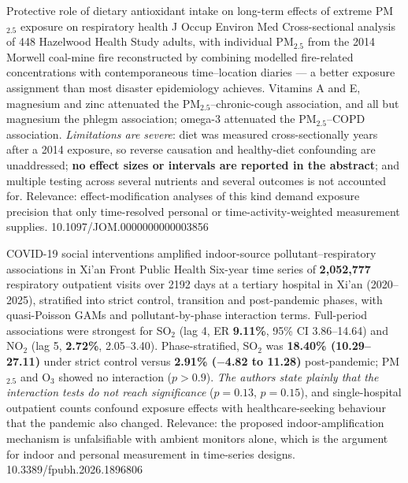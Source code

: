 \documentclass[10pt]{article}
\begin{document}
{Protective role of dietary antioxidant intake on long-term effects of extreme PM$_{2.5}$
exposure on respiratory health}
{J Occup Environ Med}
{Cross-sectional analysis of 448 Hazelwood Health Study adults, with individual PM$_{2.5}$
from the 2014 Morwell coal-mine fire reconstructed by combining modelled fire-related
concentrations with contemporaneous time--location diaries --- a better exposure
assignment than most disaster epidemiology achieves. Vitamins A and E, magnesium and zinc
attenuated the PM$_{2.5}$--chronic-cough association, and all but magnesium the
phlegm association; omega-3 attenuated the PM$_{2.5}$--COPD association. \emph{Limitations
are severe}: diet was measured cross-sectionally years after a 2014 exposure, so reverse
causation and healthy-diet confounding are unaddressed; \textbf{no effect sizes or
intervals are reported in the abstract}; and multiple testing across several nutrients
and several outcomes is not accounted for. Relevance: effect-modification analyses of this
kind demand exposure precision that only time-resolved personal or
time-activity-weighted measurement supplies.}
{10.1097/JOM.0000000000003856}

{COVID-19 social interventions amplified indoor-source pollutant--respiratory
associations in Xi'an}
{Front Public Health}
{Six-year time series of \textbf{2{,}052{,}777} respiratory outpatient visits over 2192
days at a tertiary hospital in Xi'an (2020--2025), stratified into strict control,
transition and post-pandemic phases, with quasi-Poisson GAMs and pollutant-by-phase
interaction terms. Full-period associations were strongest for SO$_2$ (lag 4, ER
\textbf{9.11\%}, 95\% CI 3.86--14.64) and NO$_2$ (lag 5, \textbf{2.72\%}, 2.05--3.40).
Phase-stratified, SO$_2$ was \textbf{18.40\% (10.29--27.11)} under strict control versus
\textbf{2.91\% ($-$4.82 to 11.28)} post-pandemic; PM$_{2.5}$ and O$_3$ showed no
interaction ($p>0.9$). \emph{The authors state plainly that the interaction tests do not
reach significance} ($p=0.13$, $p=0.15$), and single-hospital outpatient counts confound
exposure effects with healthcare-seeking behaviour that the pandemic also changed.
Relevance: the proposed indoor-amplification mechanism is unfalsifiable with ambient
monitors alone, which is the argument for indoor and personal measurement in
time-series designs.}
{10.3389/fpubh.2026.1896806}

\end{document}
